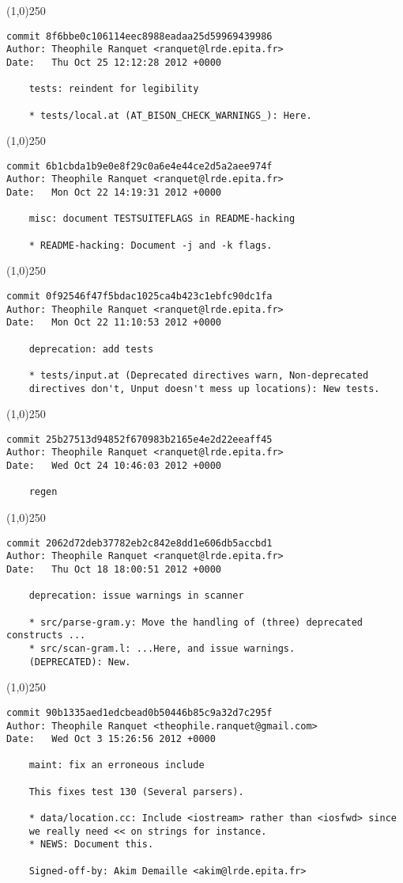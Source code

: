 \line(1,0){250}
\begin{verbatim}
commit 8f6bbe0c106114eec8988eadaa25d59969439986
Author: Theophile Ranquet <ranquet@lrde.epita.fr>
Date:   Thu Oct 25 12:12:28 2012 +0000

    tests: reindent for legibility
    
    * tests/local.at (AT_BISON_CHECK_WARNINGS_): Here.

\end{verbatim}
\line(1,0){250}
\begin{verbatim}
commit 6b1cbda1b9e0e8f29c0a6e4e44ce2d5a2aee974f
Author: Theophile Ranquet <ranquet@lrde.epita.fr>
Date:   Mon Oct 22 14:19:31 2012 +0000

    misc: document TESTSUITEFLAGS in README-hacking
    
    * README-hacking: Document -j and -k flags.

\end{verbatim}
\line(1,0){250}
\begin{verbatim}
commit 0f92546f47f5bdac1025ca4b423c1ebfc90dc1fa
Author: Theophile Ranquet <ranquet@lrde.epita.fr>
Date:   Mon Oct 22 11:10:53 2012 +0000

    deprecation: add tests
    
    * tests/input.at (Deprecated directives warn, Non-deprecated
    directives don't, Unput doesn't mess up locations): New tests.

\end{verbatim}
\line(1,0){250}
\begin{verbatim}
commit 25b27513d94852f670983b2165e4e2d22eeaff45
Author: Theophile Ranquet <ranquet@lrde.epita.fr>
Date:   Wed Oct 24 10:46:03 2012 +0000

    regen

\end{verbatim}
\line(1,0){250}
\begin{verbatim}
commit 2062d72deb37782eb2c842e8dd1e606db5accbd1
Author: Theophile Ranquet <ranquet@lrde.epita.fr>
Date:   Thu Oct 18 18:00:51 2012 +0000

    deprecation: issue warnings in scanner
    
    * src/parse-gram.y: Move the handling of (three) deprecated constructs ...
    * src/scan-gram.l: ...Here, and issue warnings.
    (DEPRECATED): New.

\end{verbatim}
\line(1,0){250}
\begin{verbatim}
commit 90b1335aed1edcbead0b50446b85c9a32d7c295f
Author: Theophile Ranquet <theophile.ranquet@gmail.com>
Date:   Wed Oct 3 15:26:56 2012 +0000

    maint: fix an erroneous include
    
    This fixes test 130 (Several parsers).
    
    * data/location.cc: Include <iostream> rather than <iosfwd> since
    we really need << on strings for instance.
    * NEWS: Document this.
    
    Signed-off-by: Akim Demaille <akim@lrde.epita.fr>

\end{verbatim}
